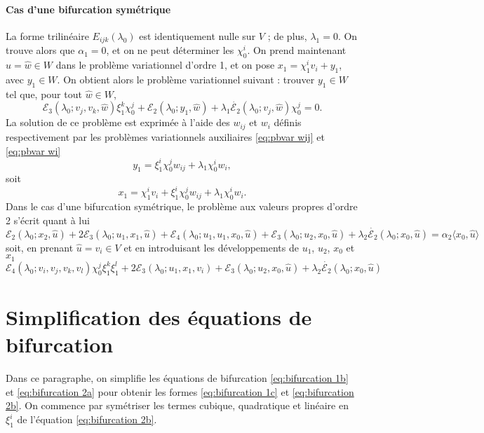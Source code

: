 \documentclass{article}
\newcommand{\nocomma}{}
\begin{document}
\paragraph{Cas d'une bifurcation sym{\'e}trique}La forme trilin{\'e}aire $E_{i
\nocomma j \nocomma k} (\lambda_0)$ est identiquement nulle sur $V$ ; de plus,
$\lambda_1 = 0$. On trouve alors que $\alpha_1 = 0$, et on ne peut
d{\'e}terminer les $\chi_0^i$. On prend maintenant $\hat{u} = \hat{w} \in W$
dans le probl{\`e}me variationnel d'ordre 1, et on pose $x_1 = \chi_1^i v_i +
y_1$, avec $y_1 \in W$. On obtient alors le probl{\`e}me variationnel suivant
: trouver $y_1 \in W$ tel que, pour tout $\hat{w} \in W$,
\[ \mathcal{E}_3 (\lambda_0 ; v_j, v_k, \hat{w}) \xi_1^k \chi_0^j
   +\mathcal{E}_2 (\lambda_0 ; y_1, \hat{w}) + \lambda_1  \dot{\mathcal{E}_2}
   (\lambda_0 ; v_j, \hat{w}) \chi_0^j = 0. \]
La solution de ce probl{\`e}me est exprim{\'e}e {\`a} l'aide des $w_{i
\nocomma j}$ et $w_i$ d{\'e}finis respectivement par les probl{\`e}mes
variationnels auxiliaires \eqref{eq:pbvar wij} et \eqref{eq:pbvar wi}
\[ y_1 = \xi_1^i \chi_0^j w_{i \nocomma j} + \lambda_1 \chi_0^i w_i, \]
soit
\[ x_1 = \chi_1^i v_i + \xi_1^i \chi_0^j w_{i \nocomma j} + \lambda_1 \chi_0^i
   w_i . \]
Dans le cas d'une bifurcation sym{\'e}trique, le probl{\`e}me aux valeurs
propres d'ordre 2 s'{\'e}crit quant {\`a} lui
\[ \mathcal{E}_2 (\lambda_0 ; x_2, \hat{u}) + 2\mathcal{E}_3 (\lambda_0 ; u_1,
   x_1, \hat{u}) +\mathcal{E}_4  (\lambda_0 ; u_1, u_1, x_0, \hat{u})
   +\mathcal{E}_3 (\lambda_0 ; u_2, x_0, \hat{u}) + \lambda_2
   \dot{\mathcal{E}_2} (\lambda_0 ; x_0, \hat{u}) = \alpha_2  \langle x_0,
   \hat{u} \rangle \]
soit, en prenant $\hat{u} = \widehat{v_i} \in V$ et en introduisant les
d{\'e}veloppements de $u_1$, $u_2$, $x_0 $ et $x_1$
\[ \mathcal{E}_4  (\lambda_0 ; v_i, v_j, v_k, v_l) \chi_0^j \xi_{1 }^k \xi_1^l
   + 2\mathcal{E}_3 (\lambda_0 ; u_1, x_1, v_i) +\mathcal{E}_3 (\lambda_0 ;
   u_2, x_0, \hat{u}) + \lambda_2  \dot{\mathcal{E}_2} (\lambda_0 ; x_0,
   \hat{u}) \]
\section{Simplification des {\'e}quations de
bifurcation}\label{sec:Simplification des équations de bifurcation}

Dans ce paragraphe, on simplifie les {\'e}quations de bifurcation
\eqref{eq:bifurcation 1b} et \eqref{eq:bifurcation 2a} pour obtenir les formes
\eqref{eq:bifurcation 1c} et \eqref{eq:bifurcation 2b}. On commence par
sym{\'e}triser les termes cubique, quadratique et lin{\'e}aire en $\xi_1^i$ de
l'{\'e}quation \eqref{eq:bifurcation 2b}.
\end{document}
